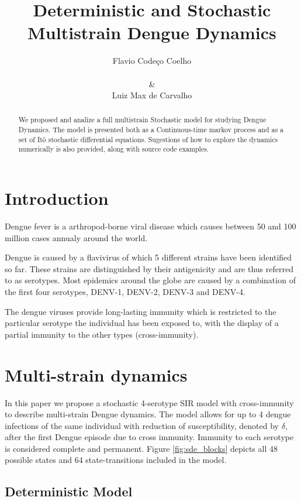 \documentclass[12pt]{article}
\title{
Deterministic and Stochastic Multistrain Dengue Dynamics
}
\author{
Flavio Code\c{c}o Coelho \\
\\
\& \\
Luiz Max de Carvalho \\
}
\date{}
\begin{document}
   
\maketitle
\begin{abstract}
 We proposed and analize a full multistrain Stochastic model for studying 
Dengue Dynamics. The model is presented both as a Continuous-time markov 
process and as a set of Itô stochastic differential equations. Sugestions of 
how to explore the dynamics numerically is also provided, along with source 
code examples. 
\end{abstract}

\section*{Introduction}

Dengue fever is a arthropod-borne viral disease which causes between 50 and 
100 million cases annualy around the world.

Dengue is caused by a flavivirus of which 5 different strains have been 
identified so far. These strains are distinguished by their antigenicity and 
are thus referred to as serotypes. Most epidemics around the globe are caused 
by a combination of the first four serotypes, DENV-1, DENV-2, DENV-3 and DENV-4.

The dengue viruses provide long-lasting immunity which is restricted to the 
particular serotype the individual has been exposed to, with the display of a 
partial immunity to the other types (cross-immunity).


\section*{Multi-strain dynamics}

In this paper we propose a stochastic 4-serotype SIR model with 
cross-immunity to describe multi-strain Dengue dynamics. 
The model allows for up to 4 dengue infections of the same individual
with reduction of susceptibility, denoted by $\delta$, after the first Dengue 
episode due to cross immunity. 
Immunity to each serotype is considered complete and permanent. 
Figure \ref{fig:sde_blocks} depicts all 48 possible states and 64 
state-transitions included in the model.

\subsection*{Deterministic Model}
\end{document}
